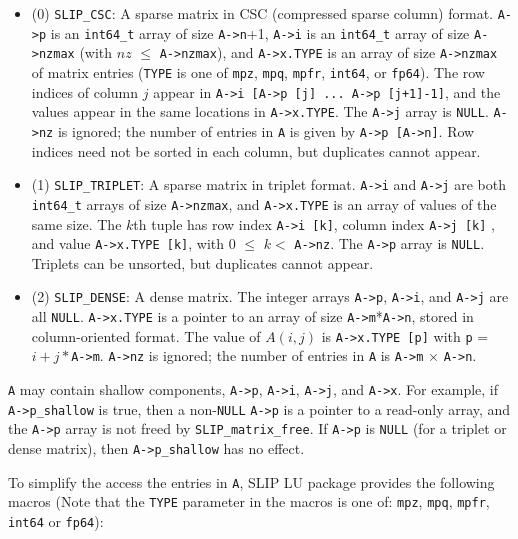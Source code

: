 \documentclass[12pt]{article}
\theoremstyle{definition}
\begin{document}
\begin{itemize}
\item
 (0) \verb|SLIP_CSC|:  A sparse matrix in CSC (compressed sparse column) format.
      \verb|A->p| is an \verb|int64_t| array of size \verb|A->n|+1, \verb|A->i|
      is an \verb|int64_t| array of size \verb|A->nzmax| (with $nz$ $\le$
      \verb|A->nzmax|), and \verb|A->x.TYPE| is an array of size
      \verb|A->nzmax| of matrix entries (\verb'TYPE' is one of \verb|mpz|,
      \verb|mpq|, \verb|mpfr|, \verb|int64|, or \verb|fp64|).  The row indices
      of column $j$ appear in \verb|A->i [A->p [j] ... A->p [j+1]-1]|, and the
      values appear in the same locations in \verb|A->x.TYPE|.  The \verb|A->j|
      array is \verb|NULL|.  \verb|A->nz| is ignored; the number of entries in
      \verb|A| is given by \verb|A->p [A->n]|.
      Row indices need not be sorted in each column, but duplicates cannot
      appear.

\item
 (1) \verb|SLIP_TRIPLET|:  A sparse matrix in triplet format.  \verb|A->i| and
     \verb|A->j| are both \verb|int64_t| arrays of size \verb|A->nzmax|, and
     \verb|A->x.TYPE| is an array of values of the same size.  The $k$th tuple
     has row index \verb|A->i [k]|, column index \verb|A->j [k]| , and value
     \verb|A->x.TYPE [k]|, with 0 $\le$ $k <$ \verb|A->nz|.
     The \verb|A->p| array is \verb|NULL|.
     Triplets can be unsorted, but duplicates cannot appear.

\item
 (2) \verb|SLIP_DENSE|:  A dense matrix.  The integer arrays \verb|A->p|,
     \verb|A->i|, and \verb|A->j| are all \verb|NULL|.  \verb|A->x.TYPE| is a
     pointer to an array of size \verb|A->m|*\verb|A->n|, stored in
     column-oriented format.  The value of $A(i,j)$ is \verb|A->x.TYPE [p]|
     with \verb|p| = $i + j*$\verb|A->m|.  \verb|A->nz| is ignored; the number
     of entries in \verb|A| is \verb|A->m| $\times$ \verb|A->n|.

\end{itemize}

\verb|A| may contain shallow components, \verb|A->p|, \verb|A->i|, \verb|A->j|,
and \verb|A->x|.  For example, if \verb|A->p_shallow| is true, then a
non-\verb|NULL| \verb|A->p| is a pointer to a read-only array, and the
\verb|A->p| array is not freed by \verb|SLIP_matrix_free|.  If \verb|A->p| is
\verb|NULL| (for a triplet or dense matrix), then \verb|A->p_shallow| has no
effect.

To simplify the access the entries in \verb|A|, SLIP LU package provides the
following macros (Note that the \verb|TYPE| parameter in the macros is one of:
\verb|mpz|, \verb|mpq|, \verb|mpfr|, \verb|int64| or \verb|fp64|):
\end{document}
